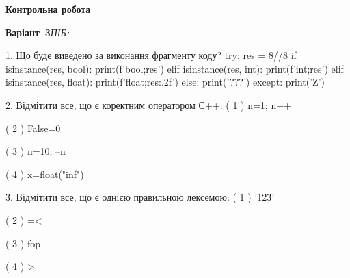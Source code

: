 \documentclass[11pt]{article}
\begin{document}
{\large\textbf{Контрольна робота}}

\textbf{Варіант \No\,3}\hfill \textit{ПІБ:}\,\underline{\hspace{60mm}}
\vspace{4mm}

1. Що буде виведено за виконання фрагменту коду?
try:
    res = 8//8%
    if isinstance(res, bool):
        print(f'bool;{res}')
    elif isinstance(res, int):
        print(f'int;{res}')
    elif isinstance(res, float):
        print(f'float;{res:.2f}')
    else:
        print('???')
except:
    print('Z')


2. Відмітити все, що є коректним оператором С++:
( 1 ) n=1; n++

( 2 ) False=0

( 3 ) n=10; --n

( 4 ) x=float("inf")


3. Відмітити все, що є однією правильною лексемою:
( 1 ) '123'

( 2 ) =<

( 3 ) fop

( 4 ) >


\newpage
\end{document}
